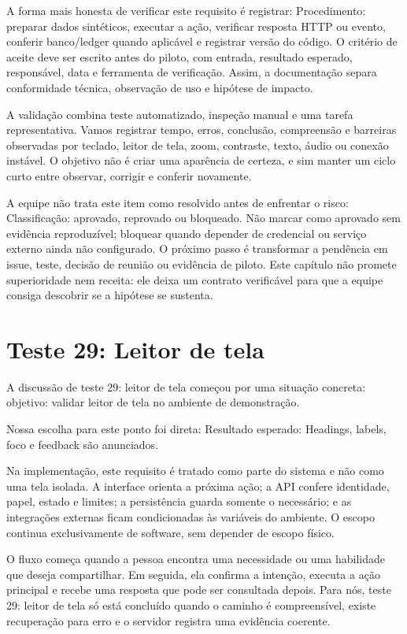 \documentclass[12pt,oneside,a4paper,article]{abntex2}
\begin{document}
A forma mais honesta de verificar este requisito é registrar: Procedimento: preparar dados sintéticos, executar a ação, verificar resposta HTTP ou evento, conferir banco/ledger quando aplicável e registrar versão do código. O critério de aceite deve ser escrito antes do piloto, com entrada, resultado esperado, responsável, data e ferramenta de verificação. Assim, a documentação separa conformidade técnica, observação de uso e hipótese de impacto.

A validação combina teste automatizado, inspeção manual e uma tarefa representativa. Vamos registrar tempo, erros, conclusão, compreensão e barreiras observadas por teclado, leitor de tela, zoom, contraste, texto, áudio ou conexão instável. O objetivo não é criar uma aparência de certeza, e sim manter um ciclo curto entre observar, corrigir e conferir novamente.

A equipe não trata este item como resolvido antes de enfrentar o risco: Classificação: aprovado, reprovado ou bloqueado. Não marcar como aprovado sem evidência reproduzível; bloquear quando depender de credencial ou serviço externo ainda não configurado. O próximo passo é transformar a pendência em issue, teste, decisão de reunião ou evidência de piloto. Este capítulo não promete superioridade nem receita: ele deixa um contrato verificável para que a equipe consiga descobrir se a hipótese se sustenta.

\section{Teste 29: Leitor de tela}
A discussão de teste 29: leitor de tela começou por uma situação concreta: objetivo: validar leitor de tela no ambiente de demonstração.

Nossa escolha para este ponto foi direta: Resultado esperado: Headings, labels, foco e feedback são anunciados.

Na implementação, este requisito é tratado como parte do sistema e não como uma tela isolada. A interface orienta a próxima ação; a API confere identidade, papel, estado e limites; a persistência guarda somente o necessário; e as integrações externas ficam condicionadas às variáveis do ambiente. O escopo continua exclusivamente de software, sem depender de escopo físico.

O fluxo começa quando a pessoa encontra uma necessidade ou uma habilidade que deseja compartilhar. Em seguida, ela confirma a intenção, executa a ação principal e recebe uma resposta que pode ser consultada depois. Para nós, teste 29: leitor de tela só está concluído quando o caminho é compreensível, existe recuperação para erro e o servidor registra uma evidência coerente.
\end{document}

